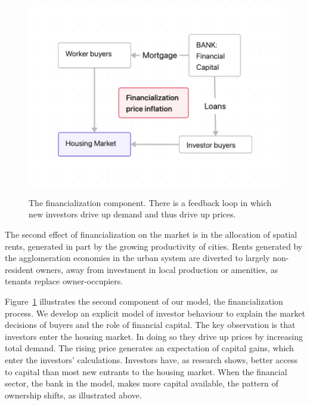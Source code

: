 \begin{figure}[!ht]
\centering
\includegraphics[scale=.70]{fig/flow_financialization.png}
\label{fig-financial-cycle}
\caption[The financialization component of the model.]{The financialization component. There is a feedback loop in which new investors drive up demand and thus drive up prices.}
\end{figure}

The second effect of financialization on the market is in the allocation of spatial rents, generated in part by the growing productivity of cities. Rents generated by the \gls{agglomeration} economies in the urban system are diverted to largely non-resident owners, away from investment in local production or amenities, as tenants replace owner-occupiers.

Figure~\ref{fig-financial-cycle} illustrates the second component of our model, the financialization process. We develop an explicit model of investor behaviour to explain the market decisions of buyers and the role of financial capital. The key observation is that investors enter the housing market. In doing so they drive up prices by increasing total demand. The rising price generates an expectation of capital gains, which enter the investors' calculations. Investors have, as research shows, better access to capital than most new entrants to the housing market. When the financial sector, the bank in the model, makes more capital available, the pattern of ownership shifts, as illustrated above.

